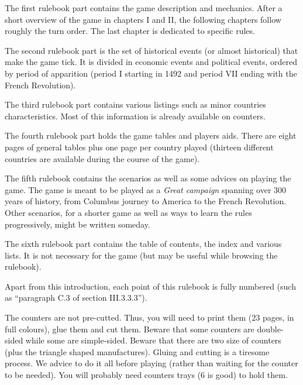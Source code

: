 The first rulebook part contains the game description and mechanics. After a
short overview of the game in chapters I and II, the following chapters follow
roughly the turn order. The last chapter is dedicated to specific rules.

The second rulebook part is the set of historical events (or almost
historical) that make the game tick. It is divided in economic events and
political events, ordered by period of apparition (period I starting in 1492
and period VII ending with the French Revolution).

The third rulebook part contains various listings such as minor countries
characteristics. Most of this information is already available on
counters.

The fourth rulebook part holds the game tables and players aids. There are
eight pages of general tables plus one page per country played (thirteen
different countries are available during the course of the game).

The fifth rulebook contains the scenarios as well as some advices on playing
the game. The game is meant to be played as a \emph{Great campaign} spanning
over 300 years of history, from Columbus journey to America to the French
Revolution. Other scenarios, for a shorter game as well as ways to learn the
rules progressively, might be written someday.

The sixth rulebook part contains the table of contents, the index and various
lists. It is not necessary for the game (but may be useful while browsing the
rulebook).

Apart from this introduction, each point of this rulebook is fully numbered
(such as ``paragraph C.3 of section III.3.3.3'').

The counters are not pre-cutted. Thus, you will need to print them (23 pages,
in full colours), glue them and cut them. Beware that some counters are
double-sided while some are simple-sided. Beware that there are two size of
counters (plus the triangle shaped manufactures). Gluing and cutting is a
tiresome process. We advice to do it all before playing (rather than waiting
for the counter to be needed). You will probably need counters trays (6 is
good) to hold them.

